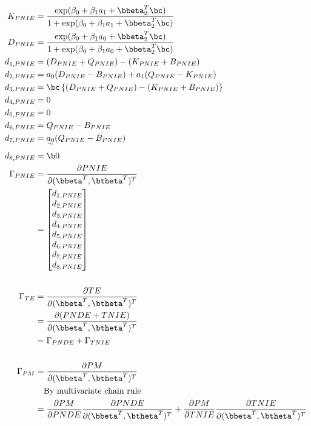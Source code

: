 \documentclass[dvipdfmx,10pt]{article}
\begin{document}
\begin{align*}
  K_{PNIE} &= \frac
      {    \exp(\beta_{0} + \beta_{1}a_{1} + \bbeta_{2}^{T}\bc)}
      {1 + \exp(\beta_{0} + \beta_{1}a_{1} + \bbeta_{2}^{T}\bc)}\\
  D_{PNIE} &= \frac
      {    \exp(\beta_{0} + \beta_{1}a_{0} + \bbeta_{2}^{T}\bc)}
      {1 + \exp(\beta_{0} + \beta_{1}a_{0} + \bbeta_{2}^{T}\bc)}\\
  d_{1,PNIE} &= (D_{PNIE} + Q_{PNIE}) - (K_{PNIE} + B_{PNIE})\\
  d_{2,PNIE} &= a_{0}(D_{PNIE} - B_{PNIE}) + a_{1}(Q_{PNIE} - K_{PNIE})\\
  d_{3,PNIE} &= \bc \left\{ (D_{PNIE} + Q_{PNIE}) - (K_{PNIE} + B_{PNIE}) \right\}\\
  d_{4,PNIE} &= 0\\
  d_{5,PNIE} &= 0\\
  d_{6,PNIE} &= Q_{PNIE} - B_{PNIE}\\
  d_{7,PNIE} &= \uwave{a_{0}} (Q_{PNIE} - B_{PNIE})\\
  d_{8,PNIE} &= \b0\\
  \Gamma_{PNIE}
  &= \frac{\partial PNIE}{\partial (\bbeta^{T},\btheta^{T})^{T}}\\
  &= \begin{bmatrix}
      d_{1,PNIE}\\
      d_{2,PNIE}\\
      d_{3,PNIE}\\
      d_{4,PNIE}\\
      d_{5,PNIE}\\
      d_{6,PNIE}\\
      d_{7,PNIE}\\
      d_{8,PNIE}\\
    \end{bmatrix}\\
  \\
  \Gamma_{TE}
  &= \frac{\partial TE}{\partial (\bbeta^{T},\btheta^{T})^{T}}\\
  &= \frac{\partial (PNDE+TNIE)}{\partial (\bbeta^{T},\btheta^{T})^{T}}\\
  &= \Gamma_{PNDE} + \Gamma_{TNIE}\\
  \\
  \Gamma_{PM}
  &= \frac{\partial PM}{\partial (\bbeta^{T},\btheta^{T})^{T}}\\
  &~~~\text{By multivariate chain rule}\\
  &= \frac{\partial PM}{\partial PNDE}\frac{\partial PNDE}{\partial (\bbeta^{T},\btheta^{T})^{T}} + \frac{\partial PM}{\partial TNIE}\frac{\partial TNIE}{\partial (\bbeta^{T},\btheta^{T})^{T}}\\

\end{align*}
\end{document}
